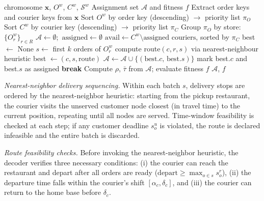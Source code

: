 \documentclass[runningheads]{llncs}
\begin{document}
\begin{algorithm}[ht]
\caption{Chromosome Decoder for window $w$}
\label{alg:decoder}
\begin{algorithmic}[1]
\Require chromosome $\mathbf{x}$, $O^w$, $C^w$, $\mathcal{S}^w$
\Ensure Assignment set $\mathcal{A}$ and fitness $f$
\State Extract order keys and courier keys from $\mathbf{x}$
\State Sort $O^w$ by order key (descending) $\rightarrow$ priority list $\pi_O$
\State Sort $C^w$ by courier key (descending) $\rightarrow$ priority list $\pi_C$
\State Group $\pi_O$ by store: $\{O^w_r\}_{r \in R}$
\State $\mathcal{A} \leftarrow \emptyset$;\ $\text{assigned} \leftarrow \emptyset$
    \State $\text{avail} \leftarrow C^w \setminus \text{assigned couriers}$, sorted by $\pi_C$
        \State best $\leftarrow$ None
            \State $s \leftarrow$ first $k$ orders of $O^w_r$
                \State compute route$(c, r, s)$ via nearest-neighbour heuristic
                    \State best $\leftarrow (c, s, \text{route})$
                \EndIf
            \EndFor
        \EndFor
            \State $\mathcal{A} \leftarrow \mathcal{A} \cup \{(\text{best}.c,\,\text{best}.s)\}$
            \State mark best$.c$ and best$.s$ as assigned
        \Else
            \State \textbf{break}
        \EndIf
    \EndWhile
\EndFor
\State Compute $\rho$, $\bar{\tau}$ from $\mathcal{A}$; evaluate fitness $f$
\State \Return $\mathcal{A}$, $f$
\end{algorithmic}
\end{algorithm}

\emph{Nearest-neighbor delivery sequencing.}
Within each batch $s$, delivery stops are ordered by the nearest-neighbor heuristic: starting from the pickup restaurant, the courier visits the unserved customer node closest (in travel time) to the current position, repeating until all nodes are served. Time-window feasibility is checked at each step; if any customer deadline $s^u_o$ is violated, the route is declared infeasible and the entire batch is discarded.

\emph{Route feasibility checks.}
Before invoking the nearest-neighbor heuristic, the decoder verifies three necessary conditions: (i) the courier can reach the restaurant and depart
after all orders are ready ($\text{depart} \geq \max_{o \in s} s^r_o$),
(ii) the departure time falls within the courier's shift $[\alpha_c, \delta_c]$, and
(iii) the courier can return to the home base before $\delta_c$.
\end{document}
